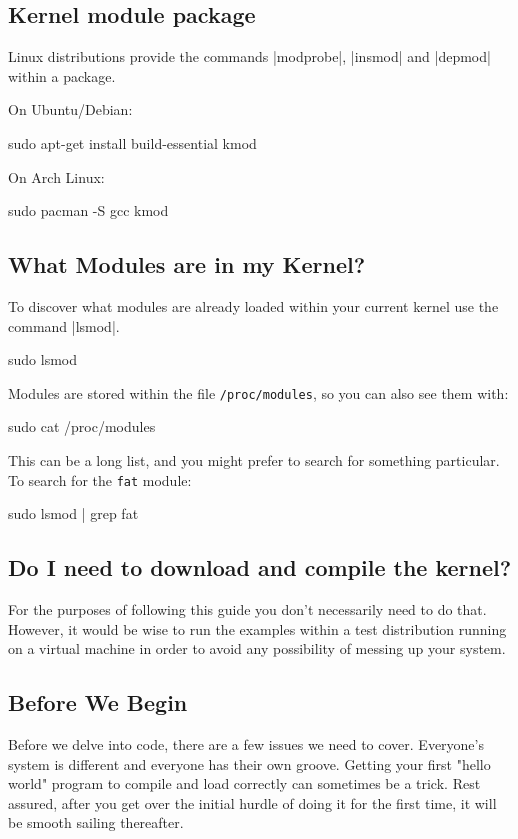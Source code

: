 \documentclass[10pt, oneside]{book}
\begin{document}
\subsection{Kernel module package}
\label{sec:packages}

Linux distributions provide the commands \sh|modprobe|, \sh|insmod| and \sh|depmod| within a package.

On Ubuntu/Debian:
\begin{codebash}
sudo apt-get install build-essential kmod
\end{codebash}

On Arch Linux:
\begin{codebash}
sudo pacman -S gcc kmod
\end{codebash}

\subsection{What Modules are in my Kernel?}
\label{sec:modutils}

To discover what modules are already loaded within your current kernel use the command \sh|lsmod|.
\begin{codebash}
sudo lsmod
\end{codebash}

Modules are stored within the file \verb|/proc/modules|, so you can also see them with:
\begin{codebash}
sudo cat /proc/modules
\end{codebash}

This can be a long list, and you might prefer to search for something particular.
To search for the \verb|fat| module:
\begin{codebash}
sudo lsmod | grep fat
\end{codebash}

\subsection{Do I need to download and compile the kernel?}
\label{sec:buildkernel}
For the purposes of following this guide you don't necessarily need to do that.
However, it would be wise to run the examples within a test distribution running on a virtual machine in order to avoid any possibility of messing up your system.

\subsection{Before We Begin}
\label{sec:preparation}
Before we delve into code, there are a few issues we need to cover.
Everyone's system is different and everyone has their own groove.
Getting your first "hello world" program to compile and load correctly can sometimes be a trick.
Rest assured, after you get over the initial hurdle of doing it for the first time, it will be smooth sailing thereafter.
\end{document}
